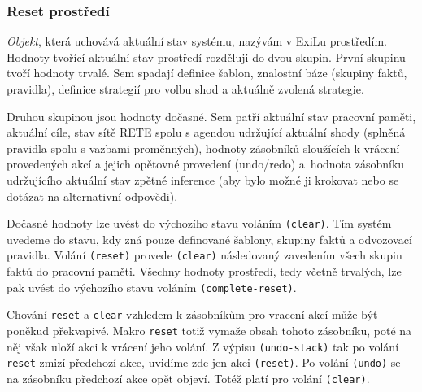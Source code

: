 \subsubsection{Reset prostředí}
\label{env cleanup}

\emph{Objekt}, která uchovává aktuální stav systému, nazývám v ExiLu prostředím.
Hodnoty tvořící aktuální stav prostředí rozděluji do dvou skupin. První skupinu
tvoří hodnoty trvalé. Sem spadají definice šablon, znalostní báze (skupiny
faktů, pravidla), definice strategií pro volbu shod a aktuálně zvolená
strategie.

Druhou skupinou jsou hodnoty dočasné. Sem patří aktuální stav pracovní paměti,
aktuální cíle, stav sítě RETE spolu s agendou udržující aktuální shody (splněná
pravidla spolu s vazbami proměnných), hodnoty zásobníků sloužících k vrácení
provedených akcí a jejich opětovné provedení (undo/redo) a~hodnota zásobníku
udržujícího aktuální stav zpětné inference (aby bylo možné ji krokovat nebo se
dotázat na alternativní odpovědi).

Dočasné hodnoty lze uvést do výchozího stavu voláním \verb|(clear)|. Tím systém
uvedeme do stavu, kdy zná pouze definované šablony, skupiny faktů a odvozovací
pravidla. Volání \verb|(reset)| provede \verb|(clear)| následovaný zavedením
všech skupin faktů do pracovní paměti. Všechny hodnoty prostředí, tedy včetně
trvalých, lze pak uvést do výchozího stavu voláním \verb|(complete-reset)|.

Chování \verb|reset| a \verb|clear| vzhledem k zásobníkům pro vracení akcí
může být poněkud překvapivé. Makro \verb|reset| totiž vymaže obsah tohoto
zásobníku, poté na něj však uloží akci k vrácení jeho volání. Z výpisu
\verb|(undo-stack)| tak po volání \verb|reset| zmizí předchozí akce, uvidíme zde
jen akci \verb|(reset)|. Po volání \verb|(undo)| se na zásobníku předchozí akce
opět objeví. Totéž platí pro volání \verb|(clear)|.
